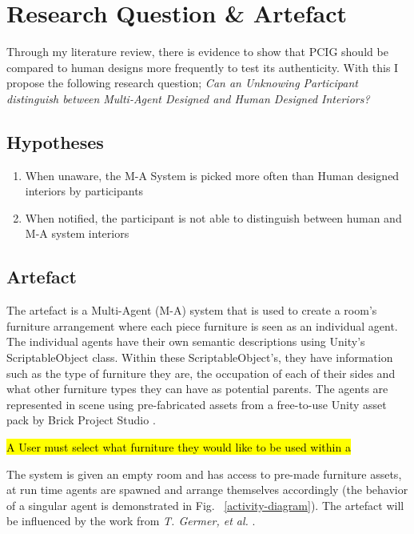 \section{Research Question \& Artefact}


Through my literature review, there is evidence to show that PCIG should be compared to human designs more frequently to test its authenticity. With this I propose the following research question; \textit{Can an Unknowing Participant distinguish between Multi-Agent Designed and Human Designed Interiors?}

\subsection{Hypotheses}
\begin{enumerate}
    \item When unaware, the M-A System is picked more often than Human designed interiors by participants
    \item When notified, the participant is not able to distinguish between human and M-A system interiors
\end{enumerate}

\subsection{Artefact}
The artefact is a Multi-Agent (M-A) system that is used to create a room's furniture arrangement where each piece furniture is seen as an individual agent. The individual agents have their own semantic descriptions using Unity's \cite{unity} ScriptableObject class. Within these ScriptableObject's, they have information such as the type of furniture they are, the occupation of each of their sides and what other furniture types they can have as potential parents. The agents are represented in scene using pre-fabricated assets from a free-to-use Unity asset pack by Brick Project Studio \cite{brick-project}.

\hl{A User must select what furniture they would like to be used within a}

The system is given an empty room and has access to pre-made furniture assets, at run time agents are spawned and arrange themselves accordingly (the behavior of a singular agent is demonstrated in Fig. ~\ref{activity-diagram}). The artefact will be influenced by the work from \textit{T. Germer, et al.} \cite{real-time-walkthroughs}.

